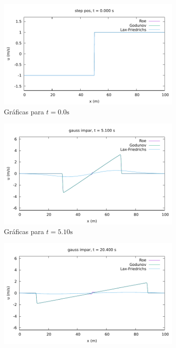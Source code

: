 \documentclass[12pt]{article}
\begin{document}
	\begin{figure}[h]
		\centering
		\begin{subfigure}[b]{0.49\textwidth}
			\includegraphics[width=\textwidth]{../burgers1DVF/results/sol_fijas/step_pos/000.pdf}
			\caption*{Gráficas para $t=0.0\unit{\second}$}
			\label{fig:gauss_impar-fija1}
		\end{subfigure}
		\vfill
		\begin{subfigure}[b]{0.49\textwidth}
			\includegraphics[width=\textwidth]{../burgers1DVF/results/sol_fijas/gauss_impar/170.pdf}
			\caption*{Gráficas para $t=5.10\unit{\second}$}
			\label{fig:gauss_impar-fija2}
		\end{subfigure}
		\vfill
		\begin{subfigure}[b]{0.49\textwidth}
			\includegraphics[width=\textwidth]{../burgers1DVF/results/sol_fijas/gauss_impar/680.pdf}

\end{subfigure}
\end{figure}
\end{document}
